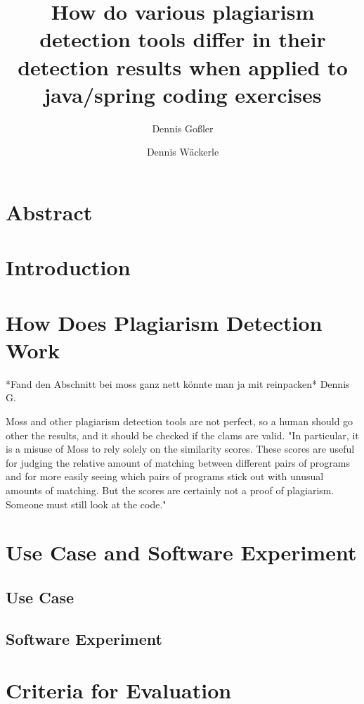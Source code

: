 \documentclass[a4paper, 11pt]{article}
\renewcommand{\\}{\vspace*{0.5\baselineskip} \newline}
\begin{document}
\title{How do various plagiarism detection tools differ in their detection results when applied to java/spring coding exercises}
\author{Dennis Goßler \and Dennis Wäckerle}
\maketitle

\section*{Abstract}
\newpage
\tableofcontents
\newpage

\section{Introduction}

\section{How Does Plagiarism Detection Work}


*Fand den Abschnitt bei moss ganz nett könnte man ja mit reinpacken* Dennis G.

Moss and other plagiarism detection tools are not perfect, so a human should go other the results, and it should be checked if the clams are valid.
"In particular, it is a misuse of Moss to rely solely on the similarity scores. These scores are useful for judging the relative amount of matching between different pairs of programs and for more easily seeing which pairs of programs stick out with unusual amounts of matching. But the scores are certainly not a proof of plagiarism. Someone must still look at the code."
\autocite{SMOSS}

\section{Use Case and Software Experiment}

\subsection{Use Case}

\subsection{Software Experiment}

\section{Criteria for Evaluation}
\end{document}
